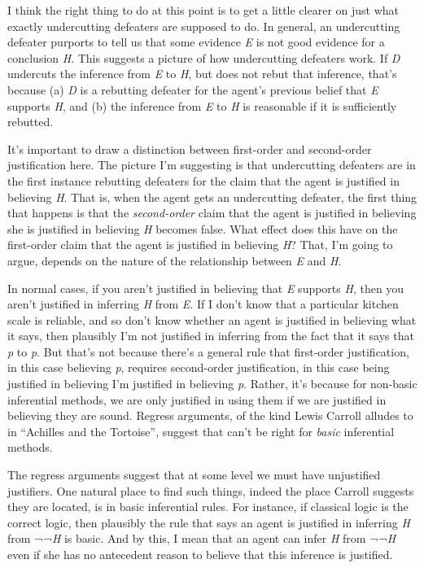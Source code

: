 \documentclass[
  11pt,
  letterpaper,
  DIV=11,
  numbers=noendperiod,
  twoside]{scrartcl}
\begin{document}
I think the right thing to do at this point is to get a little clearer
on just what exactly undercutting defeaters are supposed to do. In
general, an undercutting defeater purports to tell us that some evidence
\emph{E} is not good evidence for a conclusion \emph{H}. This suggests a
picture of how undercutting defeaters work. If \emph{D} undercuts the
inference from \emph{E} to \emph{H}, but does not rebut that inference,
that's because (a) \emph{D} is a rebutting defeater for the agent's
previous belief that \emph{E} supports \emph{H}, and (b) the inference
from \emph{E} to \emph{H} is reasonable if it is sufficiently rebutted.

It's important to draw a distinction between first-order and
second-order justification here. The picture I'm suggesting is that
undercutting defeaters are in the first instance rebutting defeaters for
the claim that the agent is justified in believing \emph{H}. That is,
when the agent gets an undercutting defeater, the first thing that
happens is that the \emph{second-order} claim that the agent is
justified in believing she is justified in believing \emph{H} becomes
false. What effect does this have on the first-order claim that the
agent is justified in believing \emph{H}? That, I'm going to argue,
depends on the nature of the relationship between \emph{E} and \emph{H}.

In normal cases, if you aren't justified in believing that \emph{E}
supports \emph{H}, then you aren't justified in inferring \emph{H} from
\emph{E}. If I don't know that a particular kitchen scale is reliable,
and so don't know whether an agent is justified in believing what it
says, then plausibly I'm not justified in inferring from the fact that
it says that \emph{p} to \emph{p}. But that's not because there's a
general rule that first-order justification, in this case believing
\emph{p}, requires second-order justification, in this case being
justified in believing I'm justified in believing \emph{p}. Rather, it's
because for non-basic inferential methods, we are only justified in
using them if we are justified in believing they are sound. Regress
arguments, of the kind Lewis Carroll alludes to in ``Achilles and the
Tortoise'', suggest that can't be right for \emph{basic} inferential
methods.

The regress arguments suggest that at some level we must have
unjustified justifiers. One natural place to find such things, indeed
the place Carroll suggests they are located, is in basic inferential
rules. For instance, if classical logic is the correct logic, then
plausibly the rule that says an agent is justified in inferring \emph{H}
from ¬¬\emph{H} is basic. And by this, I mean that an agent can infer
\emph{H} from ¬¬\emph{H} even if she has no antecedent reason to believe
that this inference is justified.
\end{document}
